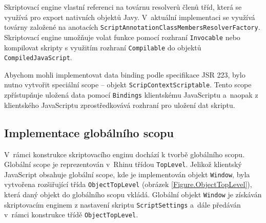 Skriptovací engine vlastní referenci na továrnu resolverů členů tříd, která se využívá pro export nativních objektů Javy. V~aktuální implementaci se využívá továrny založené na anotacích \texttt{ScriptAnnotationClassMembersResolverFactory}. Skriptovací engine umožňuje volat funkce pomocí rozhraní \texttt{Invocable} nebo kompilovat skripty s využitím rozhraní \texttt{Compilable} do objektů \texttt{CompiledJavaScript}.

Abychom mohli implementovat data binding podle specifikace JSR 223, bylo nutno vytvořit speciální scope -- objekt \texttt{ScripContextScriptable}. Tento scope zpřístupňuje uložená data pomocí \texttt{Bindings} klientskému JavaScriptu a~naopak z klientského JavaScriptu zprostředkovává rozhraní pro uložení dat skriptu.

\subsection{Implementace globálního scopu}
\label{Chapter.Implementation.GlobalScopeImplementation}

V~rámci konstrukce skriptovacího enginu dochází k tvorbě globálního scopu. Globální scope je reprezentován v~Rhinu třídou \texttt{TopLevel}. Jelikož klientský JavaScript obsahuje globální scope, kde je implementován objekt \texttt{Window}, byla vytvořena rozšiřující třída \texttt{ObjectTopLevel} (obrázek \ref{Figure.ObjectTopLevel}), která daný objekt do globálního scopu vkládá. Globální objekt \texttt{Window} je získáván skriptovacím enginem z nastavení skriptu \texttt{ScriptSettings} a~dále předáván v~rámci konstrukce třídě \texttt{ObjectTopLevel}.

\medskip

